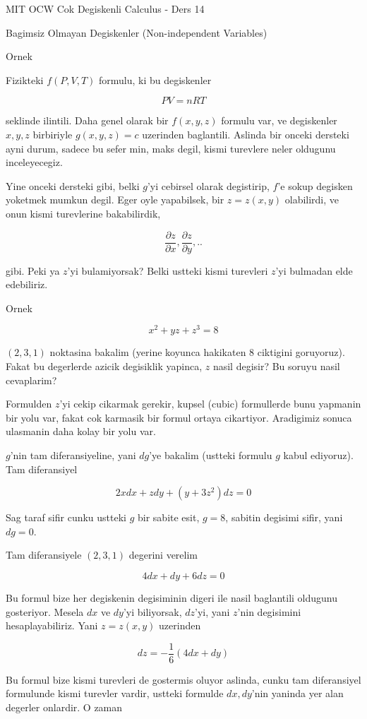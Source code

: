 \documentclass[12pt,fleqn]{article}
\begin{document}
MIT OCW Cok Degiskenli Calculus - Ders 14

Bagimsiz Olmayan Degiskenler (Non-independent Variables)

Ornek

Fizikteki $f(P,V,T)$ formulu, ki bu degiskenler 

\[ PV = nRT \]

seklinde ilintili. Daha genel olarak bir $f(x,y,z)$ formulu var, ve
degiskenler $x,y,z$ birbiriyle $g(x,y,z) = c$ uzerinden baglantili. Aslinda
bir onceki dersteki ayni durum, sadece bu sefer min, maks degil, kismi
turevlere neler oldugunu inceleyecegiz. 

Yine onceki dersteki gibi, belki $g$'yi cebirsel olarak degistirip, $f$'e
sokup degisken yoketmek mumkun degil. Eger oyle yapabilsek, bir $z =
z(x,y)$ 
olabilirdi, ve onun kismi turevlerine bakabilirdik,

\[ \frac{\partial z}{\partial x}, \frac{\partial z}{\partial y}, .. \]

gibi. Peki ya $z$'yi bulamiyorsak? Belki ustteki kismi turevleri $z$'yi
bulmadan elde edebiliriz. 

Ornek

\[ x^2 + yz + z^3 = 8 \]

$(2,3,1)$ noktasina bakalim (yerine koyunca hakikaten 8 ciktigini
goruyoruz). Fakat bu degerlerde azicik degisiklik yapinca, $z$ nasil
degisir? Bu soruyu nasil cevaplarim? 

Formulden $z$'yi cekip cikarmak gerekir, kupsel (cubic) formullerde bunu
yapmanin bir yolu var, fakat cok karmasik bir formul ortaya
cikartiyor. Aradigimiz sonuca ulasmanin daha kolay bir yolu var. 

$g$'nin tam diferansiyeline, yani $dg$'ye bakalim (ustteki formulu $g$
kabul ediyoruz). Tam diferansiyel

\[ 2x dx + z dy + (y+3z^2) dz = 0\]

Sag taraf sifir cunku ustteki $g$ bir sabite esit, $g=8$, sabitin degisimi
sifir, yani $dg=0$. 

Tam diferansiyele $(2,3,1)$ degerini verelim

\[ 4dx + dy + 6dz = 0 \]

Bu formul bize her degiskenin degisiminin digeri ile nasil baglantili
oldugunu gosteriyor. Mesela $dx$ ve $dy$'yi biliyorsak, $dz$'yi, yani
$z$'nin degisimini hesaplayabiliriz. Yani $z=z(x,y)$ uzerinden 

\[ dz = -\frac{1}{6}(4dx + dy) \]

Bu formul bize kismi turevleri de gostermis oluyor aslinda, cunku tam
diferansiyel formulunde kismi turevler vardir, ustteki formulde $dx,dy$'nin
yaninda yer alan degerler onlardir. O zaman
\end{document}
